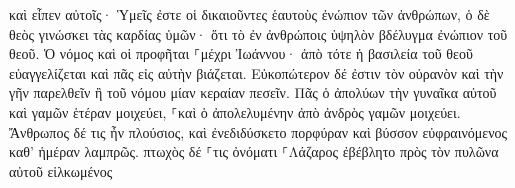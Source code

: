 \documentclass{openreader}
\begin{document}
καὶ εἶπεν αὐτοῖς· Ὑμεῖς ἐστε οἱ δικαιοῦντες ἑαυτοὺς ἐνώπιον τῶν ἀνθρώπων, ὁ δὲ θεὸς γινώσκει τὰς καρδίας ὑμῶν· ὅτι τὸ ἐν ἀνθρώποις ὑψηλὸν βδέλυγμα ἐνώπιον τοῦ θεοῦ. 
Ὁ νόμος καὶ οἱ προφῆται ⸀μέχρι Ἰωάννου· ἀπὸ τότε ἡ βασιλεία τοῦ θεοῦ εὐαγγελίζεται καὶ πᾶς εἰς αὐτὴν βιάζεται. 
Εὐκοπώτερον δέ ἐστιν τὸν οὐρανὸν καὶ τὴν γῆν παρελθεῖν ἢ τοῦ νόμου μίαν κεραίαν πεσεῖν. 
Πᾶς ὁ ἀπολύων τὴν γυναῖκα αὐτοῦ καὶ γαμῶν ἑτέραν μοιχεύει, ⸀καὶ ὁ ἀπολελυμένην ἀπὸ ἀνδρὸς γαμῶν μοιχεύει. 
Ἄνθρωπος δέ τις ἦν πλούσιος, καὶ ἐνεδιδύσκετο πορφύραν καὶ βύσσον εὐφραινόμενος καθ’ ἡμέραν λαμπρῶς. 
πτωχὸς δέ ⸀τις ὀνόματι ⸀Λάζαρος ἐβέβλητο πρὸς τὸν πυλῶνα αὐτοῦ εἱλκωμένος 
\end{document}
